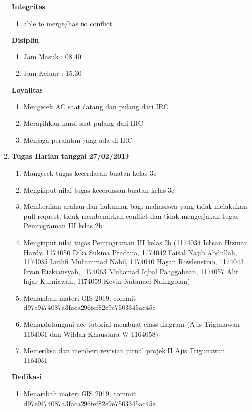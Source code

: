 \begin{enumerate}
\textbf{Integritas}
\begin{enumerate}
\item able to merge/has no conflict
\end{enumerate}

\textbf{Disiplin}
\begin{enumerate}
\item Jam Masuk : 08.40
\item Jam Keluar : 15.30
\end{enumerate}

\textbf{Loyalitas}
\begin{enumerate}
\item Mengecek AC saat datang dan pulang dari IRC
\item Merapihkan kursi saat pulang dari IRC
\item Menjaga peralatan yang ada di IRC
\end{enumerate}

\item \textbf{Tugas Harian tanggal 27/02/2019}
\begin{enumerate}
\item Mangecek tugas kecerdasan buatan kelas 3c
\item Menginput nilai tugas kecerdasan buatan kelas 3c
\item Memberikan arahan dan hukuman bagi mahasiswa yang tidak melakukan pull request, tidak membenarkan conflict dan tidak mengerjakan tugas Pemrograman III kelas 2b
\item Menginput nilai tugas Pemrograman III kelas 2b (1174034 Ichsan Hizman Hardy, 1174050 Dika Sukma Pradana, 1174042 Faisal Najib Abdullah, 1174035 Luthfi Muhammad Nabil, 1174040 Hagan Rowlenstino, 1174043 Irvan Rizkiansyah, 1174063 Muhamad Iqbal Panggabean, 1174057 Alit fajar Kurniawan, 1174059 Kevin Natanael Nainggolan)
\item Menambah materi GIS 2019, commit d97e9474087a3faca296fef82e9e7503345ac45e
\item Menandatangani acc tutorial membuat class diagram (Ajis Trigunawan 1164031 dan Wildan Khaustara W 1164058)
\item Memeriksa dan memberi revisian jurnal projek II Ajis Trigunawan 1164031
\end{enumerate}

\textbf{Dedikasi}
\begin{enumerate}
\item Menambah materi GIS 2019, commit d97e9474087a3faca296fef82e9e7503345ac45e
\end{enumerate}


\end{enumerate}
